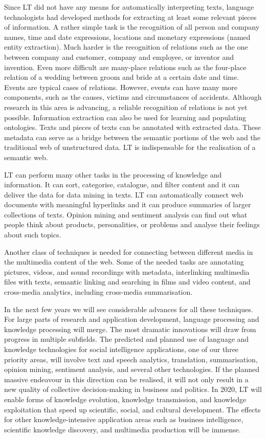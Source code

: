 \documentclass[10pt, plain]{../../metanetpaper}
\begin{document}
\begin{multicols}{2}
Since LT did not have any means for automatically interpreting texts, language technologists had developed methods for extracting at least some relevant pieces of information. A rather simple task is the recognition of all person and company names, time and date expressions, locations and monetary expressions (named entity extraction). Much harder is the recognition of relations such as the one between company and customer, company and employee, or inventor and invention. Even more difficult are many-place relations such as the four-place relation of a wedding between groom and bride at a certain date and time. Events are typical cases of relations. However, events can have many more components, such as the causes, victims and circumstances of accidents. Although research in this area is advancing, a reliable recognition of relations is not yet possible. Information extraction can also be used for learning and populating ontologies. Texts and pieces of texts can be annotated with extracted data. These metadata can serve as a bridge between the semantic portions of the web and the traditional web of unstructured data. LT is indispensable for the realisation of a semantic web.
 
LT can perform many other tasks in the processing of knowledge and information. It can sort, categorise, catalogue, and filter content and it can deliver the data for data mining in texts. LT can automatically connect web documents with meaningful hyperlinks and it can produce summaries of larger collections of texts. Opinion mining and sentiment analysis can find out what people think about products, personalities, or problems and analyse their feelings about such topics.

Another class of techniques is needed for connecting between different media in the multimedia content of the web. Some of the needed tasks are annotating pictures, videos, and sound recordings with metadata, interlinking multimedia files with texts, semantic linking and searching in films and video content, and cross-media analytics, including cross-media summarisation.
 
In the next few years we will see considerable advances for all these techniques. For large parts of research and application development, language processing and knowledge processing will merge. The most dramatic innovations will draw from progress in multiple subfields. The predicted and planned use of language and knowledge technologies for social intelligence applications, one of our three priority areas, will involve text and speech analytics, translation, summarisation, opinion mining, sentiment analysis, and several other technologies. If the planned massive endeavour in this direction can be realised, it will not only result in a new quality of collective decision-making in business and politics. In 2020, LT will enable forms of knowledge evolution, knowledge transmission, and knowledge exploitation that speed up scientific, social, and cultural development. The effects for other knowledge-intensive application areas such as business intelligence, scientific knowledge discovery, and multimedia production will be immense.


\end{multicols}
\end{document}
